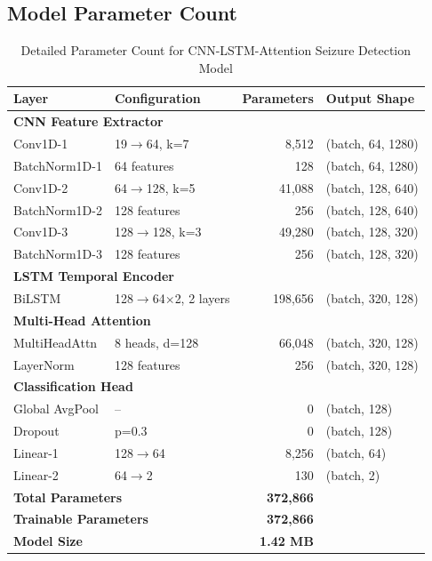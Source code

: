 \documentclass[12pt,a4paper]{article}
\begin{document}
\subsection{Model Parameter Count}

\begin{table}[H]
\centering
\caption{Detailed Parameter Count for CNN-LSTM-Attention Seizure Detection Model}
\label{tab:params}
\begin{tabular}{llrl}
\toprule
\textbf{Layer} & \textbf{Configuration} & \textbf{Parameters} & \textbf{Output Shape} \\
\midrule
\multicolumn{4}{l}{\textbf{CNN Feature Extractor}} \\
\midrule
Conv1D-1 & 19$\rightarrow$64, k=7 & 8,512 & (batch, 64, 1280) \\
BatchNorm1D-1 & 64 features & 128 & (batch, 64, 1280) \\
Conv1D-2 & 64$\rightarrow$128, k=5 & 41,088 & (batch, 128, 640) \\
BatchNorm1D-2 & 128 features & 256 & (batch, 128, 640) \\
Conv1D-3 & 128$\rightarrow$128, k=3 & 49,280 & (batch, 128, 320) \\
BatchNorm1D-3 & 128 features & 256 & (batch, 128, 320) \\
\midrule
\multicolumn{4}{l}{\textbf{LSTM Temporal Encoder}} \\
\midrule
BiLSTM & 128$\rightarrow$64$\times$2, 2 layers & 198,656 & (batch, 320, 128) \\
\midrule
\multicolumn{4}{l}{\textbf{Multi-Head Attention}} \\
\midrule
MultiHeadAttn & 8 heads, d=128 & 66,048 & (batch, 320, 128) \\
LayerNorm & 128 features & 256 & (batch, 320, 128) \\
\midrule
\multicolumn{4}{l}{\textbf{Classification Head}} \\
\midrule
Global AvgPool & -- & 0 & (batch, 128) \\
Dropout & p=0.3 & 0 & (batch, 128) \\
Linear-1 & 128$\rightarrow$64 & 8,256 & (batch, 64) \\
Linear-2 & 64$\rightarrow$2 & 130 & (batch, 2) \\
\midrule
\multicolumn{2}{l}{\textbf{Total Parameters}} & \textbf{372,866} & \\
\multicolumn{2}{l}{\textbf{Trainable Parameters}} & \textbf{372,866} & \\
\multicolumn{2}{l}{\textbf{Model Size}} & \textbf{1.42 MB} & \\
\bottomrule
\end{tabular}
\end{table}
\end{document}
